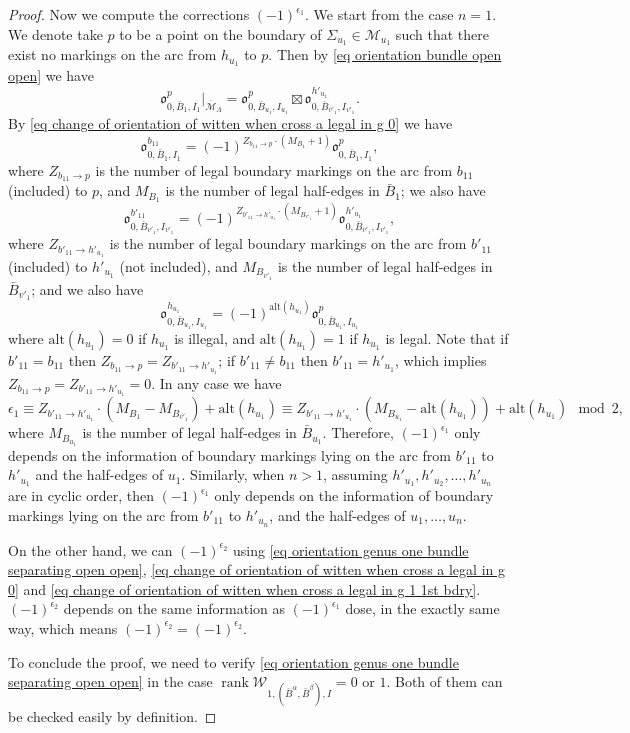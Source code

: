 \documentclass[11pt,a4paper]{article}
\theoremstyle{definition}
\theoremstyle{remark}
\newcommand{\alt}{{\text{alt}}}
\numberwithin{equation}{section}
\def\Mbar{{\overline{\mathcal M}}}
\begin{document}
\begin{proof}
    Now we compute the corrections $(-1)^{\epsilon_1}$. We start from the case $n=1$. We denote take $p$ to be a point on the boundary of $\Sigma_{u_1}\in \mathcal M_{u_1}$ such that there exist no markings on the arc from $h_{u_1}$ to $p$. Then by \eqref{eq orientation bundle open open} we have 
    $$
    {\mathfrak{o}}^{p}_{0,\bar B_1,I_1}\big \vert_{\Mbar_{\Lambda}}={\mathfrak{o}}^{p}_{0,\bar B_{u_1},I_{u_1}}\boxtimes {\mathfrak{o}}^{h'_{u_1}}_{0,\bar B_{v'_1},I_{v'_1}}.
    $$
    By \eqref{eq change of orientation of witten when cross a legal in g 0} we have
    $$
    {\mathfrak{o}}^{b_{11}}_{0,\bar B_1,I_1}=(-1)^{Z_{b_{11}\to p}\cdot(M_{B_1}+1)}{\mathfrak{o}}^{p}_{0,\bar B_1,I_1},
    $$
    where $Z_{b_{11}\to p}$ is the number of legal boundary markings on the arc from $b_{11}$ (included) to $p$, and $M_{B_1}$ is the number of legal half-edges in $\bar B_1$;
    we also have
     $$
    {\mathfrak{o}}^{b'_{11}}_{0,\bar B_{v'_1},I_{v'_1}}=(-1)^{Z_{b'_{11}\to h'_{u_1}}\cdot (M_{B_{v'_1}}+1)}{\mathfrak{o}}^{h'_{u_1}}_{0,\bar B_{v'_1},I_{v'_1}},
    $$
     where $Z_{b'_{11}\to h'_{u_1}}$ is the number of legal boundary markings on the arc from $b'_{11}$ (included) to $h'_{u_1}$ (not included), and $M_{B_{v'_1}}$ is the number of legal half-edges in $\bar B_{v'_1}$;
    and we also have  
    $$
    {\mathfrak{o}}^{h_{u_1}}_{0,\bar B_{u_1},I_{u_1}}= (-1)^{\alt(h_{u_1})}{\mathfrak{o}}^{p}_{0,\bar B_{u_1},I_{u_1}}
    $$
    where $ \alt(h_{u_1})=0$ if  $h_{u_1}$ is illegal, and $ \alt(h_{u_1})=1$ if  $h_{u_1}$ is legal. 
    Note that if $b'_{11}=b_{11}$ then $Z_{b_{11}\to p}=Z_{b'_{11}\to h'_{u_1}}$;  if $b'_{11}\ne b_{11}$ then $b'_{11} =h'_{u_1}$, which implies $Z_{b_{11}\to p}=Z_{b'_{11}\to h'_{u_1}}=0$. In any case we have 
    $$
    \epsilon_1\equiv Z_{b'_{11}\to h'_{u_1}} \cdot (M_{B_1}-M_{B_{v'_1}})+\alt(h_{u_1})\equiv Z_{b'_{11}\to h'_{u_1}} \cdot (M_{B_{u_1}}-\alt(h_{u_1}))+\alt(h_{u_1})\mod 2,
    $$
    where $M_{B_{u_1}}$ is the number of legal half-edges in $\bar B_{u_1}$. Therefore, $(-1)^{\epsilon_1}$ only depends on the information of boundary markings lying on the arc from $b'_{11}$ to $h'_{u_1}$ and the half-edges of $u_1$. Similarly, when $n>1$, assuming $h'_{u_1},h'_{u_2},\dots,h'_{u_n}$ are in cyclic order, then $(-1)^{\epsilon_1}$ only depends on the information of boundary markings lying on the arc from $b'_{11}$ to $h'_{u_n}$, and the half-edges of $u_1,\dots,u_n$.

    On the other hand, we can $(-1)^{\epsilon_2}$ using  \eqref{eq orientation genus one bundle separating open open}, \eqref{eq change of orientation of witten when cross a legal in g 0} and \eqref{eq change of orientation of witten when cross a legal in g 1 1st bdry}. $(-1)^{\epsilon_2}$ depends on the same information as $(-1)^{\epsilon_1}$ dose, in the exactly same way, which means $(-1)^{\epsilon_2}=(-1)^{\epsilon_2}$.
    
     To conclude the proof, we need to verify \eqref{eq orientation genus one bundle separating open open} in the case $\operatorname{rank} \mathcal W_{1,(\bar{B}^\alpha,\bar{B}^\beta),I}=0 $ or $1$. Both of them can be checked easily by definition.
\end{proof}
\end{document}
